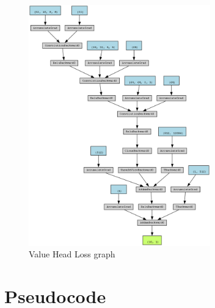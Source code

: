 \begin{figure}
    \centering
    \includegraphics[width=0.7\textwidth]{Bilder/value_graph.png}
    \caption{Value Head Loss graph}
    \label{fig:value_graph}
\end{figure}


\section{Pseudocode}

